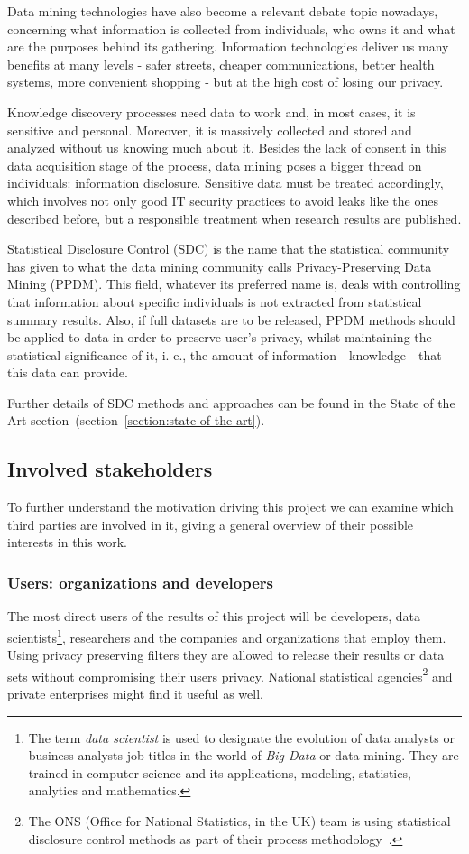 Data mining technologies have also become a relevant debate topic nowadays, concerning what information is collected from individuals, who owns it and what are the purposes behind its gathering. Information technologies deliver us many benefits at many levels - safer streets, cheaper communications, better health systems, more convenient shopping - but at the high cost of losing our privacy.

Knowledge discovery processes need data to work and, in most cases, it is sensitive and personal. Moreover, it is massively collected and stored and analyzed without us knowing much about it. Besides the lack of consent in this data acquisition stage of the process, data mining poses a bigger thread on individuals: information disclosure. Sensitive data must be treated accordingly, which involves not only good IT security practices to avoid leaks like the ones described before, but a responsible treatment when research results are published.

Statistical Disclosure Control (SDC) is the name that the statistical community has given to what the data mining community calls Privacy-Preserving Data Mining (PPDM). This field, whatever its preferred name is, deals with controlling that information about specific individuals is not extracted from statistical summary results. Also, if full datasets are to be released, PPDM methods should be applied to data in order to preserve user's privacy, whilst maintaining the statistical significance of it, i. e., the amount of information - knowledge - that this data can provide.

Further details of SDC methods and approaches can be found in the State of the Art section~(section~\ref{section:state-of-the-art}).

\subsection{Involved stakeholders}

To further understand the motivation driving this project we can examine which third parties are involved in it, giving a general overview of their possible interests in this work.

\subsubsection{Users: organizations and developers}

The most direct users of the results of this project will be developers, data scientists\footnote{The term \textit{data scientist} is used to designate the evolution of data analysts or business analysts job titles in the world of \textit{Big Data} or data mining. They are trained in computer science and its applications, modeling, statistics, analytics and mathematics.}, researchers and the companies and organizations that employ them. Using privacy preserving filters they are allowed to release their results or data sets without compromising their users privacy. National statistical agencies\footnote{The ONS (Office for National Statistics, in the UK) team is using statistical disclosure control methods as part of their process methodology~\cite{website:sdc}.} and private enterprises might find it useful as well.

